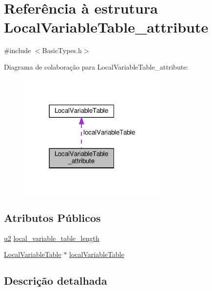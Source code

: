 \hypertarget{structLocalVariableTable__attribute}{}\section{Referência à estrutura Local\+Variable\+Table\+\_\+attribute}
\label{structLocalVariableTable__attribute}


{\ttfamily \#include $<$Basic\+Types.\+h$>$}



Diagrama de colaboração para Local\+Variable\+Table\+\_\+attribute\+:
\nopagebreak
\begin{figure}[H]
\begin{center}
\leavevmode
\includegraphics[width=213pt]{structLocalVariableTable__attribute__coll__graph}
\end{center}
\end{figure}
\subsection*{Atributos Públicos}
\begin{DoxyCompactItemize}
\item 
\hyperlink{BasicTypes_8h_a732cde1300aafb73b0ea6c2558a7a54f}{u2} \hyperlink{structLocalVariableTable__attribute_a64ee9d68a72f161a074d912bc0b8802f}{local\+\_\+variable\+\_\+table\+\_\+length}
\item 
\hyperlink{structLocalVariableTable}{Local\+Variable\+Table} $\ast$ \hyperlink{structLocalVariableTable__attribute_aac0a6412785ab3e1be4ec14b381a4eba}{local\+Variable\+Table}
\end{DoxyCompactItemize}


\subsection{Descrição detalhada}


